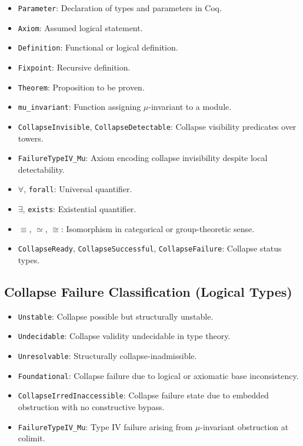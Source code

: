 \documentclass[11pt]{article}
\begin{document}
\begin{itemize}
  \item \texttt{Parameter}: Declaration of types and parameters in Coq.
  \item \texttt{Axiom}: Assumed logical statement.
  \item \texttt{Definition}: Functional or logical definition.
  \item \texttt{Fixpoint}: Recursive definition.
  \item \texttt{Theorem}: Proposition to be proven.
  \item \texttt{mu\_invariant}: Function assigning $\mu$-invariant to a module.
  \item \texttt{CollapseInvisible}, \texttt{CollapseDetectable}: Collapse visibility predicates over towers.
  \item \texttt{FailureTypeIV\_Mu}: Axiom encoding collapse invisibility despite local detectability.
  \item $\forall$, \texttt{forall}: Universal quantifier.
  \item $\exists$, \texttt{exists}: Existential quantifier.
  \item $\equiv$, $\simeq$, $\cong$: Isomorphism in categorical or group-theoretic sense.
  \item \texttt{CollapseReady}, \texttt{CollapseSuccessful}, \texttt{CollapseFailure}: Collapse status types.
\end{itemize}

\subsection*{Collapse Failure Classification (Logical Types)}

\begin{itemize}
  \item \texttt{Unstable}: Collapse possible but structurally unstable.
  \item \texttt{Undecidable}: Collapse validity undecidable in type theory.
  \item \texttt{Unresolvable}: Structurally collapse-inadmissible.
  \item \texttt{Foundational}: Collapse failure due to logical or axiomatic base inconsistency.
  \item \texttt{CollapseIrredInaccessible}: Collapse failure state due to embedded obstruction with no constructive bypass.
  \item \texttt{FailureTypeIV\_Mu}: Type IV failure arising from $\mu$-invariant obstruction at colimit.
\end{itemize}
\end{document}
